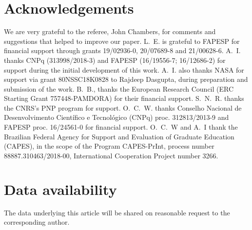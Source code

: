 \documentclass[fleqn,usenatbib]{mnras}
\begin{document}
\section*{Acknowledgements}
We are very grateful to the referee, John Chambers, for comments and suggestions that helped to improve our paper. L.~E. is grateful to FAPESP for financial support through grants 19/02936-0, 20/07689-8 and 21/00628-6. A.~I. thanks CNPq (313998/2018-3) and FAPESP (16/19556-7; 16/12686-2) for support during the initial development of this work.  A.~I. also thanks NASA for support via grant 80NSSC18K0828 to Rajdeep Dasgupta, during preparation and submission of the work. B.~B., thanks the European Research Council (ERC Starting Grant 757448-PAMDORA) for their financial support. S.~N.~R. thanks the CNRS's PNP program for support. O.~C.~W. thanks Conselho Nacional de Desenvolvimento Científico e Tecnológico (CNPq) proc. 312813/2013-9 and FAPESP proc. 16/24561-0 for financial support. O.~C.~W and A.~I  thank the Brazilian Federal Agency for Support and Evaluation of Graduate Education (CAPES), in the scope of the Program CAPES-PrInt, process number 88887.310463/2018-00, International Cooperation Project number 3266.  \\


\section*{Data availability}
The data underlying this article will be shared on reasonable request to the corresponding author.












\bsp	%
\label{lastpage}
\end{document}
